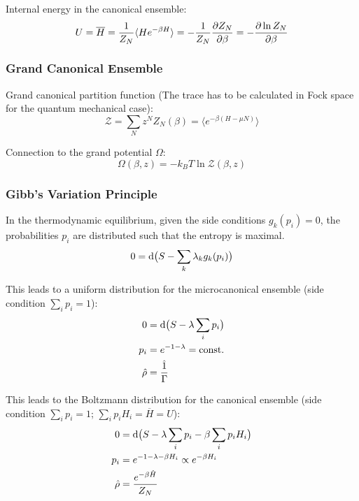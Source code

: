 			\noindent
			Internal energy in the canonical ensemble:
			\begin{equation}
				U = \overline{H} = \frac{1}{Z_N}\langle He^{-\beta H}\rangle = -\frac{1}{Z_N}\frac{\partial Z_N}{\partial \beta} = -\frac{\partial \ln Z_N}{\partial \beta}
			\end{equation}

		\subsubsection{Grand Canonical Ensemble}
			\noindent
			Grand canonical partition function (The trace has to be calculated in Fock space for the quantum mechanical case):
			\begin{equation}
				\mathcal{Z} = \sum_N z^N Z_N(\beta) = \langle e^{-\beta(H-\mu N)} \rangle
			\end{equation}

			\noindent
			Connection to the grand potential $\Omega$:
			\begin{equation}
				\Omega(\beta,z) = -k_B T \ln \mathcal{Z}(\beta,z)
			\end{equation}


		\subsubsection{Gibb's Variation Principle}
			\noindent
			In the thermodynamic equilibrium, given the side conditions $g_k(p_i) = 0$, the probabilities $p_i$ are distributed such that the entropy is maximal.
			\begin{equation}
				0 = \mathrm{d} \big( S - \sum_k \lambda_k g_k(p_i) \big)
			\end{equation}

			\noindent
			This leads to a uniform distribution for the microcanonical ensemble (side condition $\sum_i p_i = 1$):
			\begin{equation}
				\begin{aligned}
					0 &= \diff \big( S - \lambda \sum_i p_i \big) \\
					p_i &= e^{-1-\lambda} = \const \\
					\hat{\rho} &= \frac{\hat{1}}{\Gamma} \\ %
				\end{aligned}
			\end{equation}

			\noindent
			This leads to the Boltzmann distribution for the canonical ensemble (side condition $\sum_i p_i = 1$; $\sum_i p_i H_i = \overline{H} = U$):
			\begin{equation}
				\begin{aligned}
					0 &= \mathrm{d} \big( S - \lambda \sum_i p_i - \beta \sum_i p_i H_i \big) \\
					p_i &= e^{-1-\lambda-\beta H_i} \propto e^{-\beta H_i} \\
					\hat{\rho} &= \frac{e^{-\beta \hat{H}}}{Z_N} \\
				\end{aligned}
			\end{equation}

